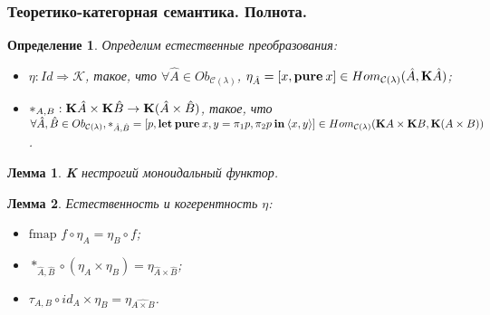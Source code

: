\documentclass[10pt,pdf,utf8,russian,aspectratio=169]{beamer}
\newtheorem{defin}{Определение}
\newtheorem{lem}{Лемма}
\begin{document}
\begin{frame}
  \frametitle{Теоретико-категорная семантика. Полнота.}

  \begin{defin}

    Определим естественные преобразования:

  \begin{itemize}
    \item $\eta:Id \Rightarrow \mathcal{K}$, такое, что $\forall \hat{A} \in Ob_{\mathcal{C}(\lambda)}$, $\eta_{\hat{A}} = [x, {\bf pure \:} x] \in Hom_{\mathcal{C}(\lambda)}(\hat{A}, {\bf K}\hat{A})$;
    \item $\ast_{A,B}:{\bf K}\hat{A} \times {\bf K}\hat{B} \to {\bf K}(\hat{A} \times \hat{B})$, такое, что $\forall \hat{A}, \hat{B} \in Ob_{\mathcal{C}(\lambda)}, \ast_{\hat{A},\hat{B}} = [p, {\bf let \: pure \:} x,y = \pi_1 p, \pi_2 p {\: \bf in \:} \langle x, y \rangle] \in Hom_{\mathcal{C}(\lambda)}({\bf K}A \times {\bf K}B, {\bf K}(A \times B))$.
  \end{itemize}
  \end{defin}

  \begin{lem}
    {\bf K} нестрогий моноидальный функтор.
  \end{lem}

  \begin{lem} Естественность и когерентность $\eta$:
  \begin{itemize}
    \item $\text{fmap } f \circ \eta_A = \eta_B \circ f$;
    \item $\ast_{\hat{A},\hat{B}} \circ (\eta_{A} \times \eta_{B}) = \eta_{\hat{A} \times \hat{B}}$;
    \item $\tau_{A, B} \circ id_A \times \eta_B = \eta_{\widehat{A \times B}}$.
  \end{itemize}
  \end{lem}

\end{frame}
\end{document}
